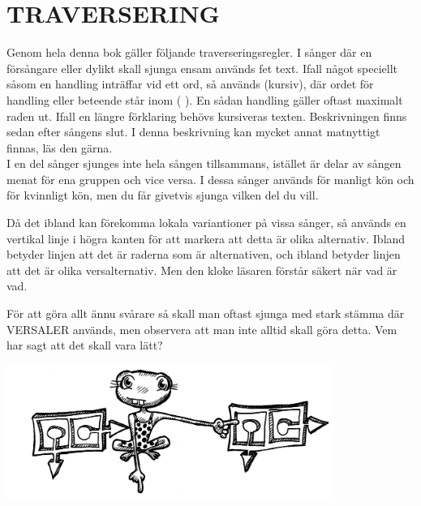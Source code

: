 \documentclass[a6paper,fontsize=10pt,twoside,open=right]{scrbook}
\begin{document}
\newpage
\section{TRAVERSERING}\vspace{10pt}
\hspace{10pt}Genom hela denna bok gäller följande
traverseringsregler. I sånger där en försångare eller dylikt skall
sjunga ensam används fet text. Ifall något speciellt såsom en handling
inträffar vid ett ord, så används (kursiv), där ordet för handling
eller beteende står inom ( ). En sådan handling gäller oftast maximalt
raden ut. Ifall en längre förklaring behövs kursiveras
texten. Beskrivningen finns sedan efter sångens slut. I denna
beskrivning kan mycket annat matnyttigt finnas, läs den
gärna.\\ \indent I en del sånger sjunges inte hela sången tillsammans,
istället är delar av sången menat för ena gruppen och vice versa. I
dessa sånger används {\Large\Male} för manligt kön och {\Large\Female}
för kvinnligt kön, men du får givetvis sjunga vilken del du vill.
\begin{leftborder}
  \hspace{10pt}Då det ibland kan förekomma lokala variantioner på vissa sånger, så
  används en  vertikal linje i högra kanten för att markera att detta
  är olika alternativ. Ibland betyder linjen att det är raderna som är
  alternativen, och ibland betyder linjen att det är olika
  versalternativ. Men den kloke läsaren förstår säkert när vad är vad.
\end{leftborder}
\hspace{15pt} För att göra allt ännu svårare så skall man oftast sjunga med stark
stämma där VERSALER används, men observera att man inte alltid skall
göra detta. Vem har sagt att det skall vara lätt?
\newpage
\cleardoublepage
\renewcommand{\contentsname}{\vspace{-2.17cm}\rmfamily{\fontsize{13}{15}\textbf{INNEHÅLL}}\vspace{45pt}}
\tableofcontents\par
\begin{center}
  \vspace*{-300pt}
  \noindent\includegraphics[keepaspectratio,width=0.8\textwidth]{elements/groda.jpg}
\end{center}
\renewcommand{\leftmark}{}
\end{document}

